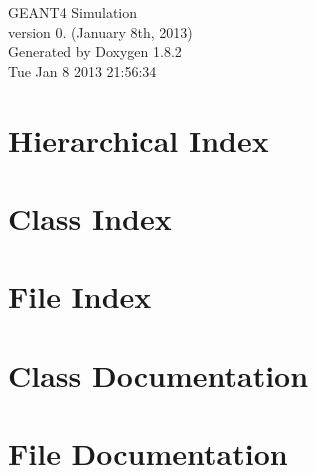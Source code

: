 \documentclass{book}
\begin{document}
\hypersetup{pageanchor=false,citecolor=blue}
\begin{titlepage}
\vspace*{7cm}
\begin{center}
{\Large G\-E\-A\-N\-T4 Simulation \\[1ex]\large version 0. (January 8th, 2013) }\\
\vspace*{1cm}
{\large Generated by Doxygen 1.8.2}\\
\vspace*{0.5cm}
{\small Tue Jan 8 2013 21:56:34}\\
\end{center}
\end{titlepage}
\clearemptydoublepage
{}
\tableofcontents
\clearemptydoublepage
{}
\hypersetup{pageanchor=true,citecolor=blue}
\chapter{Hierarchical Index}

\chapter{Class Index}

\chapter{File Index}

\chapter{Class Documentation}












\chapter{File Documentation}




























\printindex
\end{document}
